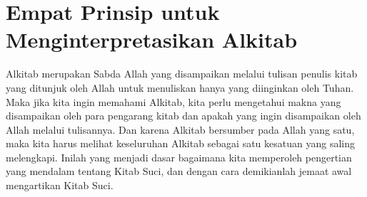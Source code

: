 \newpage
\section*{\center\LARGE{Empat Prinsip untuk Menginterpretasikan Alkitab}}
Alkitab merupakan Sabda Allah yang disampaikan melalui tulisan penulis kitab yang ditunjuk oleh Allah untuk menuliskan hanya yang diinginkan oleh Tuhan. Maka jika kita ingin memahami Alkitab, kita perlu mengetahui makna yang disampaikan oleh para pengarang kitab dan apakah yang ingin disampaikan oleh Allah melalui tulisannya. Dan karena Alkitab bersumber pada Allah yang satu, maka kita harus melihat keseluruhan Alkitab sebagai satu kesatuan yang saling melengkapi. Inilah yang menjadi dasar bagaimana kita memperoleh pengertian yang mendalam tentang Kitab Suci, dan dengan cara demikianlah jemaat awal mengartikan Kitab Suci.

